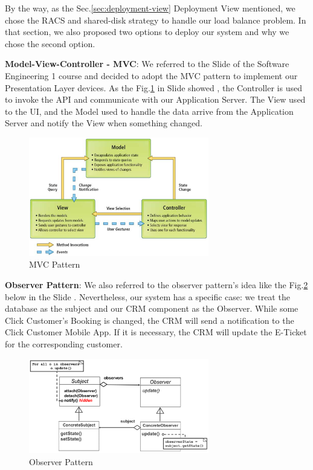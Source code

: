 \documentclass[a4paper,12pt]{report}
\begin{document}
By the way, as the Sec.\ref{sec:deployment-view} Deployment View mentioned, we chose the RACS and shared-disk strategy to handle our load balance problem.
In that section, we also proposed two options to deploy our system and why we chose the second option.

\vspace{5mm}

\textbf{Model-View-Controller - MVC}: We referred to the Slide of the Software Engineering 1 course and decided to adopt the MVC pattern to implement our Presentation Layer devices.
As the Fig.\ref{fig:MVC} in Slide showed \cite{SlidesSE1}, the Controller is used to invoke the API and communicate with our Application Server.
The View used to the UI, and the Model used to handle the data arrive from the Application Server and notify the View when something changed.


\begin{figure}[H]
	\includegraphics[width=0.7\textwidth]{MVC}
	\centering
	\caption{MVC Pattern}
	\label{fig:MVC}
\end{figure}

\vspace{5mm}

\textbf{Observer Pattern}: We also referred to the observer pattern's idea like the Fig.\ref{fig:Observer Pattern} below in the Slide \cite{SlidesSE1}.
Nevertheless, our system has a specific case: we treat the database as the subject and our CRM component as the Observer.
While some Click Customer's Booking is changed, the CRM will send a notification to the Click Customer Mobile App.
If it is necessary, the CRM will update the E-Ticket for the corresponding customer.

\begin{figure}[H]
	\includegraphics[width=0.7\textwidth]{ObserverPattern}
	\centering
	\caption{Observer Pattern}
	\label{fig:Observer Pattern}
\end{figure}
\end{document}
